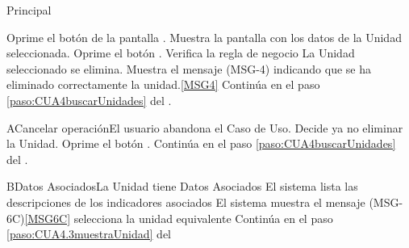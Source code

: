 	\begin{UCtrayectoria}{Principal}
 			
			\UCpaso[\UCactor] Oprime el botón  de la pantalla .
			\UCpaso Muestra la pantalla  con los datos de la Unidad seleccionada.\label{paso:CUA4.3muestraUnidad}
			\UCpaso [\UCactor] Oprime el botón . 
			\UCpaso Verifica la regla de negocio 
			\UCpaso La Unidad seleccionado se elimina.
			\UCpaso Muestra el mensaje (MSG-4) indicando que se ha eliminado correctamente la unidad.\ref{MSG4}
			\UCpaso Continúa en el paso \ref{paso:CUA4buscarUnidades} del .
	\end{UCtrayectoria}

		
		\begin{UCtrayectoriaA}{A}{Cancelar operación}{El usuario abandona el Caso de Uso.}
			\UCpaso[\UCactor] Decide ya no eliminar la Unidad. \label{Datos_Asoc_Equipo}
			\UCpaso[\UCactor] Oprime el botón .
			\UCpaso Continúa en el paso \ref{paso:CUA4buscarUnidades} del .
		\end{UCtrayectoriaA}
	
	
		\begin{UCtrayectoriaA}{B}{Datos Asociados}{La Unidad tiene Datos Asociados}
		 	\UCpaso El sistema lista las descripciones de los indicadores asociados
			\UCpaso El sistema muestra el mensaje (MSG-6C)\ref{MSG6C}
			\UCpaso [\UCactor] selecciona la unidad equivalente 
			\UCpaso Continúa en el paso \ref{paso:CUA4.3muestraUnidad} del 			
		\end{UCtrayectoriaA}
		

